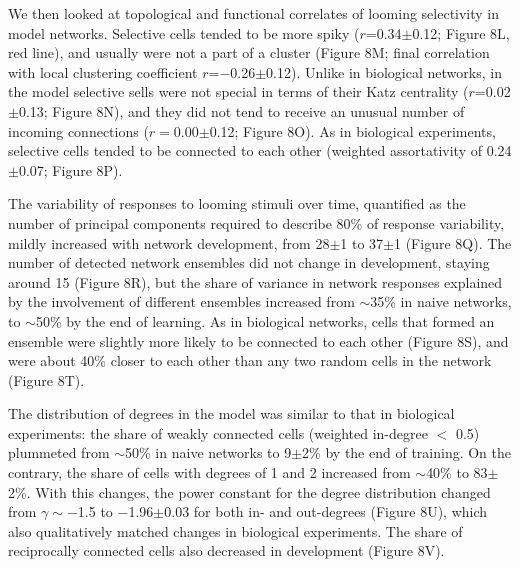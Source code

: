\documentclass{article}
\begin{document}

We then looked at topological and functional correlates of looming selectivity in model networks. Selective cells tended to be more spiky ($r$=0.34$\pm$0.12; Figure 8L, red line), and usually were not a part of a cluster (Figure 8M; final correlation with local clustering coefficient $r$=$-$0.26$\pm$0.12). Unlike in biological networks, in the model selective sells were not special in terms of their Katz centrality ($r$=0.02$\pm$0.13; Figure 8N), and they did not tend to receive an unusual number of incoming connections ($r=$0.00$\pm$0.12; Figure 8O). As in biological experiments, selective cells tended to be connected to each other (weighted assortativity of 0.24$\pm$0.07; Figure 8P). %

The variability of responses to looming stimuli over time, quantified as the number of principal components required to describe 80\% of response variability, mildly increased with network development, from 28$\pm$1 to 37$\pm$1 (Figure 8Q). The number of detected network ensembles did not change in development, staying around 15 (Figure 8R), but the share of variance in network responses explained by the involvement of different ensembles increased from $\sim$35\% in naive networks, to $\sim$50\% by the end of learning. As in biological networks, cells that formed an ensemble were slightly more likely to be connected to each other (Figure 8S), and were about 40\% closer to each other than any two random cells in the network (Figure 8T).

The distribution of degrees in the model was similar to that in biological experiments: the share of weakly connected cells (weighted in-degree $<$ 0.5) plummeted from $\sim$50\% in naive networks to 9$\pm$2\% by the end of training. On the contrary, the share of cells with degrees of 1 and 2 increased from $\sim$40\% to 83$\pm$2\%. With this changes, the power constant for the degree distribution changed from $\gamma \sim -$1.5 to $-$1.96$\pm$0.03 for both in- and out-degrees (Figure 8U), which also qualitatively matched changes in biological experiments. The share of reciprocally connected cells also decreased in development (Figure 8V).
\end{document}
